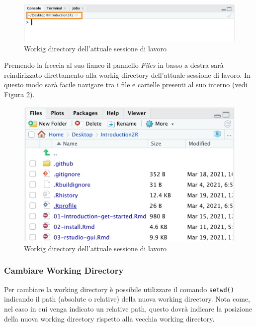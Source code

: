 \documentclass[
]{book}
\begin{document}
\begin{figure}

{\centering \includegraphics[width=0.95\linewidth]{images/current-wd} 

}

\caption{Workig directory dell'attuale sessione di lavoro}\label{fig:current-wd}
\end{figure}

Premendo la freccia al suo fianco il pannello \emph{Files} in basso a destra sarà reindirizzato direttamento alla workig directory dell'attuale sessione di lavoro. In questo modo sarà facile navigare tra i file e cartelle presenti al suo interno (vedi Figura \ref{fig:current-folder}).

\begin{figure}

{\centering \includegraphics[width=0.65\linewidth]{images/current-folder} 

}

\caption{Workig directory dell'attuale sessione di lavoro}\label{fig:current-folder}
\end{figure}

\hypertarget{cambiare-working-directory}{%
\subsubsection*{Cambiare Working Directory}\label{cambiare-working-directory}}

Per cambiare la working directory è possibile utilizzare il comando \texttt{setwd()} indicando il path (absolute o relative) della nuova working directory. Nota come, nel caso in cui venga indicato un relative path, questo dovrà indicare la posizione della nuova working directory rispetto alla vecchia working directory.
\end{document}
